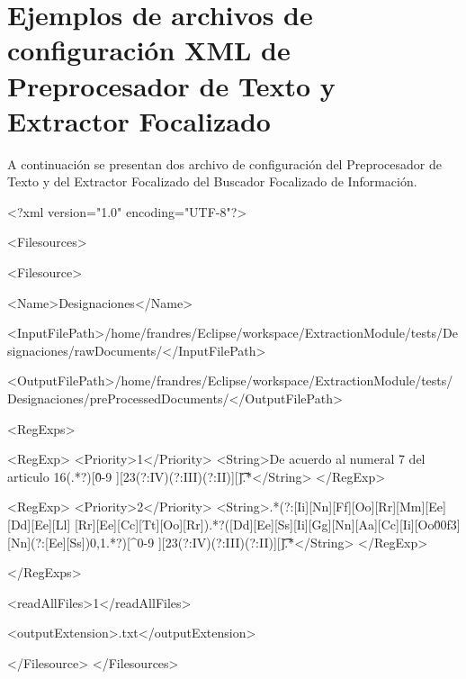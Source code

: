 \chapter{Ejemplos de archivos de configuración XML de Preprocesador de Texto y Extractor Focalizado}\label{chap:apendiceA}

A continuación se presentan dos archivo de configuración del Preprocesador de Texto y del Extractor Focalizado del Buscador Focalizado de Información.

\begin{code}[includerangemarker=false,frame=single,label=xml:Preprocesador,caption=Archivo de configuración del Preprocesador de Texto con Dominio Designaciones,firstnumber=0, mathescape]
<?xml version="1.0" encoding="UTF-8"?>

<Filesources>

	<Filesource>
	
  		<Name>Designaciones</Name>
  		
        <InputFilePath>/home/frandres/Eclipse/workspace/ExtractionModule/tests/Designaciones/rawDocuments/</InputFilePath>
        
        <OutputFilePath>/home/frandres/Eclipse/workspace/ExtractionModule/tests/Designaciones/preProcessedDocuments/</OutputFilePath>
        
        <RegExps>
        
            <RegExp>
        		<Priority>1</Priority>
       		<String>De acuerdo al numeral 7 del articulo 16(.*?)[\^0-9 ][23(?:IV)(?:III)(?:II)][\.\t].*</String>
        	</RegExp>
        	
        	<RegExp>
        		<Priority>2</Priority>
        		<String>.*(?:[Ii][Nn][Ff][Oo][Rr][Mm][Ee] [Dd][Ee][Ll] [Rr][Ee][Cc][Tt][Oo][Rr]).*?([Dd][Ee][Ss][Ii][Gg][Nn][Aa][Cc][Ii][Oo\u00f3][Nn](?:[Ee][Ss]){0,1}.*?)[^0-9 ][23(?:IV)(?:III)(?:II)][\.\t].*</String>
        	</RegExp>     
        	   	
        </RegExps>
        
        <readAllFiles>1</readAllFiles>
        
        <outputExtension>.txt</outputExtension>   
        
	</Filesource>
</Filesources>  
\end{code}

